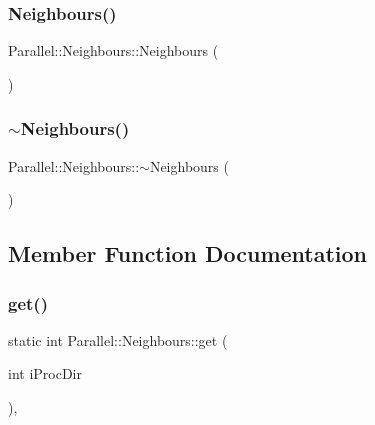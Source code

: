 \subsubsection{\texorpdfstring{Neighbours()}{Neighbours()}}
{\footnotesize\ttfamily Parallel\+::\+Neighbours\+::\+Neighbours (\begin{DoxyParamCaption}{ }\end{DoxyParamCaption})}

\mbox{\label{class_parallel_1_1_neighbours_a5c3a373ff91768a91099e7b347a62ce9}} 
\subsubsection{\texorpdfstring{$\sim$Neighbours()}{~Neighbours()}}
{\footnotesize\ttfamily Parallel\+::\+Neighbours\+::$\sim$\+Neighbours (\begin{DoxyParamCaption}{ }\end{DoxyParamCaption})}



\subsection{Member Function Documentation}
\mbox{\label{class_parallel_1_1_neighbours_a84653f3e22436280ac5a4689a24e7146}} 
\subsubsection{\texorpdfstring{get()}{get()}}
{\footnotesize\ttfamily static int Parallel\+::\+Neighbours\+::get (\begin{DoxyParamCaption}\item[{int}]{i\+Proc\+Dir }\end{DoxyParamCaption})\hspace{0.3cm}{\ttfamily [inline]}, {\ttfamily [static]}}

